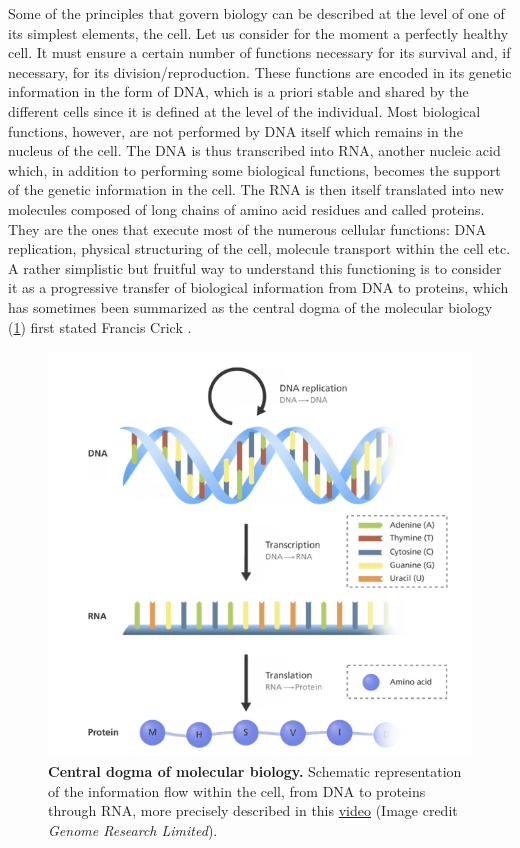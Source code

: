 \documentclass[a4paper,12pt,twoside,onecolumn,openright,final,oldfontcommands]{memoir}
\begin{document}
Some of the principles that govern biology can be described at the level
of one of its simplest elements, the cell. Let us consider for the
moment a perfectly healthy cell. It must ensure a certain number of
functions necessary for its survival and, if necessary, for its
division/reproduction. These functions are encoded in its genetic
information in the form of DNA, which is a priori stable and shared by
the different cells since it is defined at the level of the individual.
Most biological functions, however, are not performed by DNA itself
which remains in the nucleus of the cell. The DNA is thus transcribed
into RNA, another nucleic acid which, in addition to performing some
biological functions, becomes the support of the genetic information in
the cell. The RNA is then itself translated into new molecules composed
of long chains of amino acid residues and called proteins. They are the
ones that execute most of the numerous cellular functions: DNA
replication, physical structuring of the cell, molecule transport within
the cell etc. A rather simplistic but fruitful way to understand this
functioning is to consider it as a progressive transfer of biological
information from DNA to proteins, which has sometimes been summarized as
the central dogma of the molecular biology (\ref{fig:central-dogma})
first stated Francis Crick \citep{crick1970central}.

\begin{figure}

{\centering \includegraphics[width=0.8\linewidth]{fig/central-dogma} 

}

\caption[Central dogma of molecular biology]{\textbf{Central dogma of molecular biology.}
Schematic representation of the information flow within the cell, from
DNA to proteins through RNA, more precisely described in this
\href{https://www.youtube.com/watch?v=J3HVVi2k2No}{video} (Image credit
\emph{Genome Research Limited}).}\label{fig:central-dogma}
\end{figure}
\end{document}

